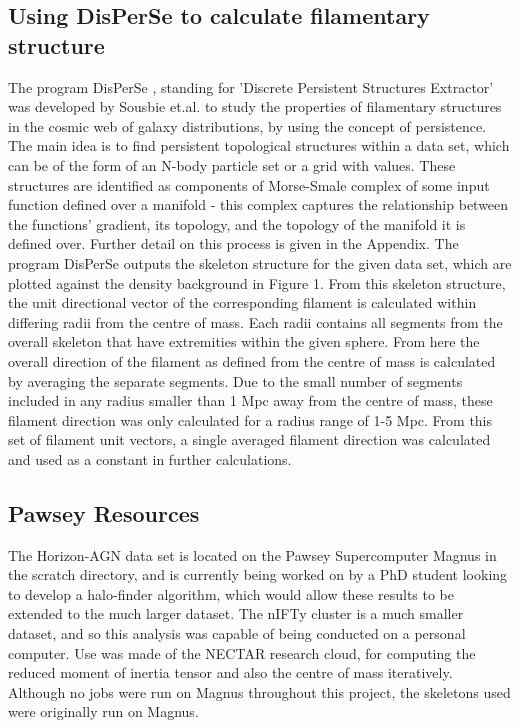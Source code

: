 \documentclass[journal]{IEEEtran}
\begin{document}
\subsection{Using DisPerSe to calculate filamentary structure}
The program DisPerSe \cite{sousbie11a}, standing for 'Discrete Persistent Structures Extractor' was developed by Sousbie et.al. to study the properties of filamentary structures in the cosmic web of galaxy distributions, by using the concept of persistence. The main idea is to find persistent topological structures within a data set, which can be of the form of an N-body particle set or a grid with values. These structures are identified as components of Morse-Smale complex of some input function defined over a manifold - this complex captures the relationship between the functions' gradient, its topology, and the topology of the manifold it is defined over. Further detail on this process is given in the Appendix.
The program DisPerSe outputs the skeleton structure for the given data set, which are plotted against the density background in Figure 1. From this skeleton structure, the unit directional vector of the corresponding filament is calculated within differing radii from the centre of mass. Each radii contains all segments from the overall skeleton that have extremities within the given sphere. From here the overall direction of the filament as defined from the centre of mass is calculated by averaging the separate segments. Due to the small number of segments included in any radius smaller than 1 Mpc away from the centre of mass, these filament direction was only calculated for a radius range of 1-5 Mpc. From this set of filament unit vectors, a single averaged filament direction was calculated and used as a constant in further calculations.

\subsection{Pawsey Resources}
The Horizon-AGN data set is located on the Pawsey Supercomputer Magnus in the scratch directory, and is currently being worked on by a PhD student looking to develop a halo-finder algorithm, which would allow these results to be extended to the much larger dataset. The nIFTy cluster is a much smaller dataset, and so this analysis was capable of being conducted on a personal computer. Use was made of the NECTAR research cloud, for computing the reduced moment of inertia tensor and also the centre of mass iteratively. Although no jobs were run on Magnus throughout this project, the skeletons used were originally run on Magnus. 
\end{document}
